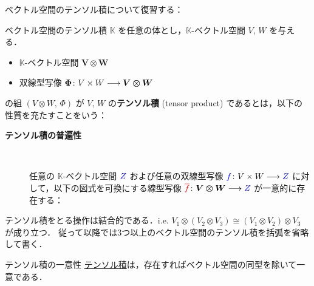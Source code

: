 \documentclass[rep_main]{subfiles}
\begin{document}
ベクトル空間のテンソル積について復習する：

\begin{mydef}[label=def:tensor-vec]{ベクトル空間のテンソル積}
    $\mathbb{K}$ を任意の体とし，$\mathbb{K}$-ベクトル空間 $V,\, W$ を与える．
    \begin{itemize}
        \item $\mathbb{K}$-ベクトル空間 $\bm{V \otimes W}$ 
        \item 双線型写像 $\bm{\Phi} \colon V \times W \longrightarrow \bm{V \otimes W}$ 
    \end{itemize}
    の組 $(V \otimes W,\, \Phi)$ が $V,\, W$ の\textbf{テンソル積} (tensor product) であるとは，以下の性質を充たすことをいう：
    \begin{description}
        \item[\textbf{テンソル積の普遍性}]　
        
        任意の $\mathbb{K}$-ベクトル空間 $\textcolor{blue}{Z}$ および任意の双線型写像 $\textcolor{blue}{f} \colon V \times W \longrightarrow \textcolor{blue}{Z}$ に対して，以下の図式を可換にする線型写像 $\textcolor{red}{\overline{f}} \colon \bm{V \otimes W} \longrightarrow \textcolor{blue}{Z}$ が一意的に存在する：
        \begin{center}
        \end{center}
    \end{description}
\end{mydef}

テンソル積をとる操作は結合的である．i.e. $V_1 \otimes (V_2 \otimes V_3) \cong (V_1 \otimes V_2) \otimes V_3$ が成り立つ．
従って以降では3つ以上のベクトル空間のテンソル積を括弧を省略して書く．

\begin{myprop}[label=prop:unique-tensor-vec]{テンソル積の一意性}
	\hyperref[def:tensor-vec]{テンソル積}は，存在すればベクトル空間の同型を除いて一意である．
\end{myprop}
\end{document}
